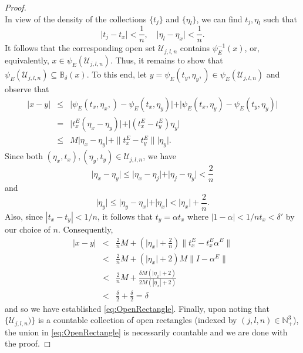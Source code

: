\documentclass[11pt]{article}
\begin{document}
\begin{proof}
\begin{equation*}
\end{equation*}
In view of the density of the collections $\{t_j\}$ and $\{\eta_l\}$, we can find $t_j, \eta_l$ such that
\begin{equation*}
    \vert t_j - t_x \vert < \frac{1}{n},\quad \vert \eta_l - \eta_x \vert < \frac{1}{n}.
\end{equation*}
It follows that the corresponding open set $\mathcal{U}_{j,l,n}$ contains $\psi_E^{-1}(x)$, or, equivalently, $x\in \psi_E(\mathcal{U}_{j,l,n})$. Thus, it remains to show that $\psi_E(\mathcal{U}_{j,l,n}) \subseteq \mathbb{B}_\delta(x)$. To this end, let $y=\psi_E(t_y,\eta_y,)\in\psi_E(\mathcal{U}_{j,l,n})$ and observe that
\begin{eqnarray*}
| x - y | &\leq& \vert \psi_E(t_x,\eta_x,) - \psi_E(t_x,\eta_y) \vert 
    + \vert \psi_E(t_x,\eta_y) - \psi_E(t_y,\eta_y) \vert\\
    &=&  \vert t_x^E (\eta_x - \eta_y) \vert + \vert (t_x^E - t_y^E) \eta_y \vert\\
    &\leq& M\vert \eta_x - \eta_y \vert + \|{t_x^E - t_y^E}\|  \vert \eta_y \vert.
\end{eqnarray*}
Since both $(\eta_x,t_x),(\eta_y,t_y) \in \mathcal{U}_{j,l,n}$, we have
\begin{equation*}
    \vert \eta_x - \eta_y \vert \leq \vert \eta_x - \eta_j \vert + \vert \eta_j - \eta_y \vert < \frac{2}{n}
\end{equation*}
and
\begin{equation*}
    \vert \eta_y \vert \leq \vert \eta_y - \eta_x \vert + \vert \eta_x \vert < \vert \eta_x \vert + \frac{2}{n}.
\end{equation*}
Also, since $|t_x-t_y|<1/n$, it follows that $t_y=\alpha t_x$ where $|1-\alpha|<1/nt_x < \delta'$ by our choice of $n$. Consequently,
\begin{eqnarray*}
    \vert x - y \vert 
    &< & \frac{2}{n} M+ \left( \vert \eta_x \vert + \frac{2}{n} \right) \|{t_x^E -   t_x^E \alpha^E}\|   \\ 
    &<& \frac{2}{n}M + \left( \vert \eta_x \vert + 2 \right)M\| I - \alpha^E\| \\
    &<&  \frac{2}{n}M +  \frac{\delta M \left( \vert \eta_x \vert + 2\right) }{2M (| \eta_x | + 2)}  \\
    &<& \frac{\delta}{2} + \frac{\delta}{2}=\delta 
\end{eqnarray*}
and so we have established \eqref{eq:OpenRectangle}. Finally, upon noting that $\{\mathcal{U}_{j,l,n})\}$ is a countable collection of open rectangles (indexed by $(j,l,n)\in\mathbb{N}_+^3$), the union in \eqref{eq:OpenRectangle} is necessarily countable and we are done with the proof.
\end{proof}
\end{document}
